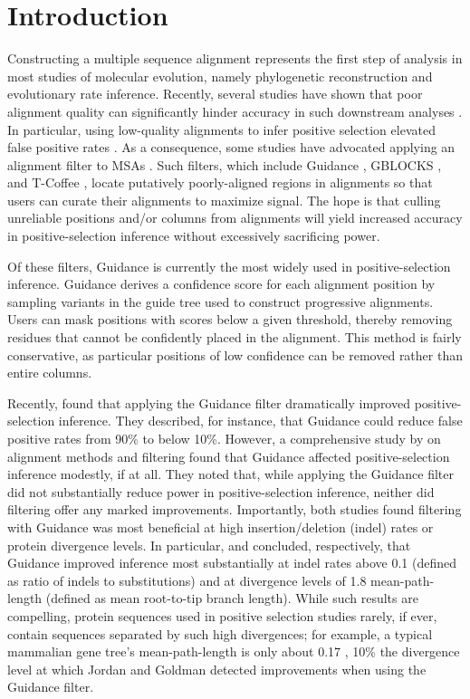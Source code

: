 \documentclass[10pt]{article}
\begin{document}
\section*{Introduction}
Constructing a multiple sequence alignment represents the first step of analysis in most studies of molecular evolution, namely phylogenetic reconstruction and evolutionary rate inference. Recently, several studies have shown that poor alignment quality can significantly hinder accuracy in such downstream analyses \citep{Ogden2006, Talavera2007, Dwivedi2009, MarkovaRaina2011, Jordan2012}. In particular, using low-quality alignments to infer positive selection elevated false positive rates \citep{Schneider2009, Fletcher2010, MarkovaRaina2011}. As a consequence, some studies have advocated applying an alignment filter to MSAs \citep{Jordan2012, Privman2012}. Such filters, which include Guidance \citep{Penn2010, Privman2012}, GBLOCKS \citep{Castresana2000}, and T-Coffee \citep{Notredame2000}, locate putatively poorly-aligned regions in alignments so that users can curate their alignments to maximize signal. The hope is that culling unreliable positions and/or columns from alignments will yield increased accuracy in positive-selection inference without excessively sacrificing power.

Of these filters, Guidance \citep{Penn2010} is currently the most widely used in positive-selection inference. Guidance derives a confidence score for each alignment position by sampling variants in the guide tree used to construct progressive alignments. Users can mask positions with scores below a given threshold, thereby removing residues that cannot be confidently placed in the alignment. This method is fairly conservative, as particular positions of low confidence can be removed rather than entire columns. 

Recently, \citet{Privman2012} found that applying the Guidance filter dramatically improved positive-selection inference. They described, for instance, that Guidance could reduce false positive rates from 90\% to below 10\%. However, a comprehensive study by \citet{Jordan2012} on alignment methods and filtering found that Guidance affected positive-selection inference modestly, if at all. They noted that, while applying the Guidance filter did not substantially reduce power in positive-selection inference, neither did filtering offer any marked improvements. Importantly, both studies found filtering with Guidance was most beneficial at high insertion/deletion (indel) rates or protein divergence levels. In particular, \citet{Privman2012} and \citet{Jordan2012} concluded, respectively, that Guidance improved inference most substantially at indel rates above 0.1 (defined as ratio of indels to substitutions) and at divergence levels of 1.8 mean-path-length (defined as mean root-to-tip branch length). While such results are compelling, protein sequences used in positive selection studies rarely, if ever, contain sequences separated by such high divergences; for example, a typical mammalian gene tree's mean-path-length is only about 0.17 \citep{Spielman2013}, 10\% the divergence level at which Jordan and Goldman detected improvements when using the Guidance filter.
\end{document}

